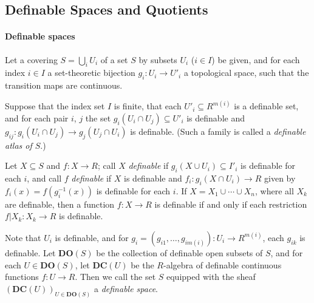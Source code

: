 \documentclass{amsart}
\newtheorem{theorem}{Theorem}[subsection]
\theoremstyle{definition}
\numberwithin{equation}{section}
\begin{document}



\subsection{Definable Spaces and Quotients}
\paragraph{\bfseries Definable spaces}
Let a covering $S = \bigcup_i U_i$ of a set $S$ by subsets $U_i$ ($i\in I$) be given,
and for each index $i \in I$ a set-theoretic bijection $g_i: U_i \to U'_i$ a topological space,
such that the transition maps are continuous.

Suppose that the index set $I$ is finite,
that each $U'_i \subseteq R^{m(i)}$ is a definable set,
and for each pair $i$, $j$ the set $g_i(U_i\cap U_j) \subseteq U'_i$
is definable and $g_{ij}: g_i(U_i\cap U_j) \to g_j(U_j\cap U_i)$ is definable.
(Such a family is called a \emph{definable atlas of $S$}.)

Let $X \subseteq S$ and $f : X \to R$;
call $X$ \emph{definable} if $g_i(X\cup U_i) \subseteq I'_i$ is definable for each $i$,
and call $f$ \emph{definable} if $X$ is definable and 
$f_i : g_i(X \cap U_i) \to R$ given by $f_i(x) = f(g_i^{-1}(x))$ is definable for each $i$.
If $X = X_1\cup \cdots \cup X_n$,
where all $X_k$ are definable,
then a function $f: X \to R$ is definable if and only if each restriction $f|X_k: X_k \to R$ is definable.

Note that $U_i$ is definable,
and for $g_i = (g_{i1},\dots,g_{im(i)}) : U_i \to R^{m(i)}$,
each $g_{ik}$ is definable.
Let $\mathbf{DO}(S)$ be the collection of definable open subsets of $S$,
and for each $U \in \mathbf{DO}(S)$,
let $\mathbf{DC}(U)$ be the $R$-algebra of definable continuous functions $f: U \to R$.
Then we call the set $S$ equipped with the sheaf $(\mathbf{DC}(U))_{U \in \mathbf{DO}(S)}$ a \emph{definable space}.
\end{document}
